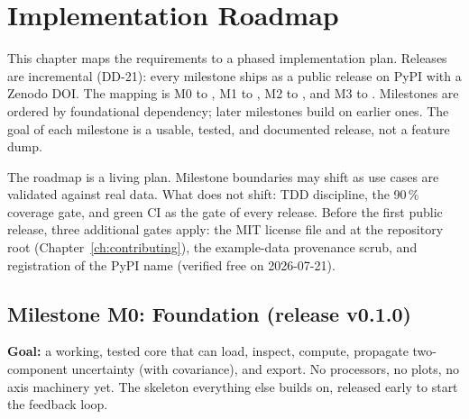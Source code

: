 
\chapter{Implementation Roadmap}
\label{ch:roadmap}

This chapter maps the \itc{} requirements to a phased implementation
plan. Releases are incremental (DD-21): every milestone ships as a public
release on PyPI with a Zenodo DOI. The mapping is M0 to ,
M1 to , M2 to , and M3 to .
Milestones are ordered by foundational dependency; later milestones build
on earlier ones. The goal of each milestone is a usable, tested, and
documented release, not a feature dump.

\begin{noteinfo}
The roadmap is a living plan. Milestone boundaries may shift as use cases
are validated against real data. What does not shift: TDD discipline, the
90\,\% coverage gate, and green CI as the gate of every release. Before
the first public release, three additional gates apply: the MIT license
file and  at the repository root
(Chapter~\ref{ch:contributing}), the example-data provenance scrub, and
registration of the PyPI name  (verified free on 2026-07-21).
\end{noteinfo}

\section{Milestone M0: Foundation (release v0.1.0)}

\textbf{Goal:} a working, tested core that can load, inspect, compute,
propagate two-component uncertainty (with covariance), and export. No
processors, no plots, no axis machinery yet. The skeleton everything else
builds on, released early to start the feedback loop.

